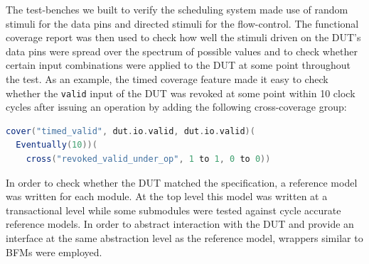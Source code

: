 \documentclass[conference]{IEEEtran}
\begin{document}
The test-benches we built to verify the scheduling system made use of random stimuli for the data pins and directed stimuli for the flow-control.
The functional coverage report was then used to check how well the stimuli driven on the DUT's data pins were spread over the spectrum of possible values and to check whether certain input combinations were applied to the DUT at some point throughout the test. 
As an example, the timed coverage feature made it easy to check whether the \texttt{valid} input of the DUT was revoked at some point within 10 clock cycles after issuing an operation by adding the following cross-coverage group:

\begin{lstlisting}[language=scala, caption={A timed cover construct.}, label={lst:timedcover}]
cover("timed_valid", dut.io.valid, dut.io.valid)(
  Eventually(10))(
    cross("revoked_valid_under_op", 1 to 1, 0 to 0))
\end{lstlisting}

In order to check whether the DUT matched the specification, a reference model was written for each module. 
At the top level this model was written at a transactional level while some submodules were tested against cycle accurate reference models.
In order to abstract interaction with the DUT and provide an interface at the same abstraction level as the reference model, wrappers similar to BFMs were employed. 
\end{document}
